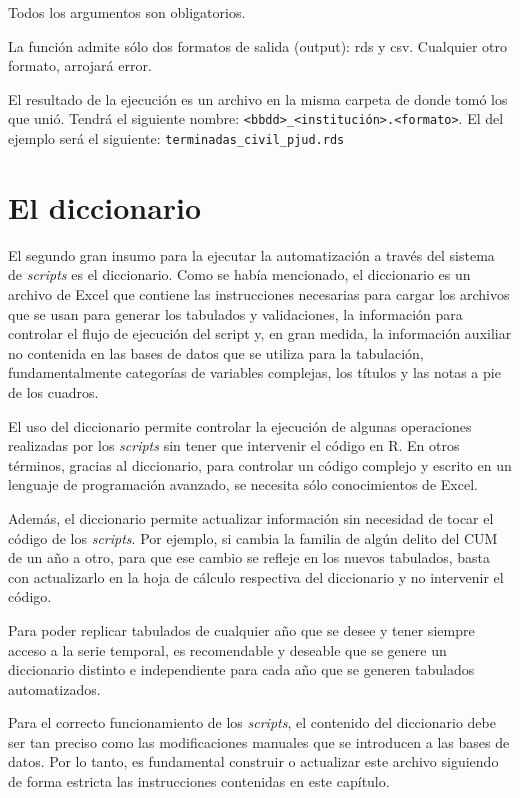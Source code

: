 \documentclass[
  spanish,
]{book}
\begin{document}
Todos los argumentos son obligatorios.

La función admite sólo dos formatos de salida (output): rds y csv. Cualquier otro formato, arrojará error.

El resultado de la ejecución es un archivo en la misma carpeta de donde tomó los que unió. Tendrá el siguiente nombre: \texttt{\textless{}bbdd\textgreater{}\_\textless{}institución\textgreater{}.\textless{}formato\textgreater{}}. El del ejemplo será el siguiente: \texttt{terminadas\_civil\_pjud.rds}

\hypertarget{el-diccionario}{%
\chapter{El diccionario}\label{el-diccionario}}

El segundo gran insumo para la ejecutar la automatización a través del sistema de \emph{scripts} es el diccionario. Como se había mencionado, el diccionario es un archivo de Excel que contiene las instrucciones necesarias para cargar los archivos que se usan para generar los tabulados y validaciones, la información para controlar el flujo de ejecución del script y, en gran medida, la información auxiliar no contenida en las bases de datos que se utiliza para la tabulación, fundamentalmente categorías de variables complejas, los títulos y las notas a pie de los cuadros.

El uso del diccionario permite controlar la ejecución de algunas operaciones realizadas por los \emph{scripts} sin tener que intervenir el código en R. En otros términos, gracias al diccionario, para controlar un código complejo y escrito en un lenguaje de programación avanzado, se necesita sólo conocimientos de Excel.

Además, el diccionario permite actualizar información sin necesidad de tocar el código de los \emph{scripts}. Por ejemplo, si cambia la familia de algún delito del CUM de un año a otro, para que ese cambio se refleje en los nuevos tabulados, basta con actualizarlo en la hoja de cálculo respectiva del diccionario y no intervenir el código.

Para poder replicar tabulados de cualquier año que se desee y tener siempre acceso a la serie temporal, es recomendable y deseable que se genere un diccionario distinto e independiente para cada año que se generen tabulados automatizados.

Para el correcto funcionamiento de los \emph{scripts}, el contenido del diccionario debe ser tan preciso como las modificaciones manuales que se introducen a las bases de datos. Por lo tanto, es fundamental construir o actualizar este archivo siguiendo de forma estricta las instrucciones contenidas en este capítulo.
\end{document}

